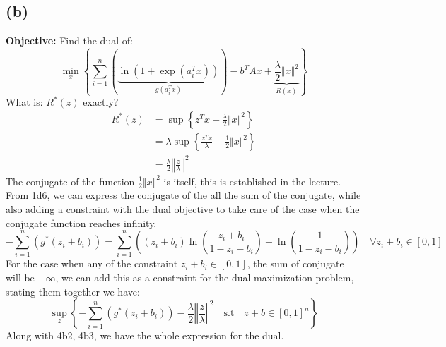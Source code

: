 \documentclass[]{article}
\begin{document}
    \subsection*{(b)}
        \textbf{Objective: }Find the dual of: 
        $$
        \min_x \left\lbrace
            \sum_{i=1}^{n}\left(
                \underbrace{\ln(1 + \exp(a_i^Tx))}
                _{g(a_i^Tx)}
            \right) - b^TAx + 
            \underbrace{\frac{\lambda}{2} \Vert x\Vert^2}_{R(x)}
        \right\rbrace
        $$
        What is: $R^*(z)$ exactly? 
        \begin{align*}\tag{4b1}\label{eqn:4b1}
            R^*(z) &= \sup \left\lbrace
                z^Tx - \frac{\lambda}{2}\Vert x\Vert^2
            \right\rbrace
            \\
            & = 
            \lambda
            \sup \left\lbrace
                \frac{z^Tx}{\lambda}  - \frac{1}{2}\Vert x\Vert^2
            \right\rbrace
            \\
            & =  
            \frac{\lambda}{2}
            \left\Vert
                \frac{z}{\lambda}
            \right\Vert^2
        \end{align*}
        The conjugate of the function $\frac{1}{2}\Vert x\Vert^2$ is itself, this is established in the lecture. \\
        From \hyperref[eqn:1d6]{1d6}, we can express the conjugate of the all the sum of the conjugate, while also adding a constraint with the dual objective to take care of the case when the conjugate function reaches infinity. 
        \begin{equation*}\tag{4b2}\label{eqn:4b2}
            - \sum_{i=1}^{n}\left(
                g^*(z_i + b_i)
            \right)
            =
            \sum_{i=1}^{n}\left(
                (z_i + b_i) \ln \left(
                        \frac{z_i + b_i}{1 - z_i - b_i}
                    \right)
                    -
                    \ln \left(
                        \frac{1}{1 - z_i - b_i} 
                    \right)
            \right) \quad \forall z_i + b_i \in [0, 1]
        \end{equation*}
        For the case when any of the constraint $z_i + b_i \in [0, 1]$, the sum of conjugate will be $-\infty$, we can add this as a constraint for the dual maximization problem, stating them together we have: 
        \begin{equation*}\tag{4b3}\label{eqn:4b3}
            \sup_z \left\lbrace
            - \sum_{i=1}^{n}\left(
                g^*(z_i + b_i)
            \right) 
            - \frac{\lambda}{2} \left\Vert
                \frac{z}{\lambda}
            \right\Vert^2
            \quad\text{s.t}\quad z + b \in [0, 1]^n
            \right\rbrace
        \end{equation*}
        Along with 4b2, 4b3, we have the whole expression for the dual. 
\end{document}
